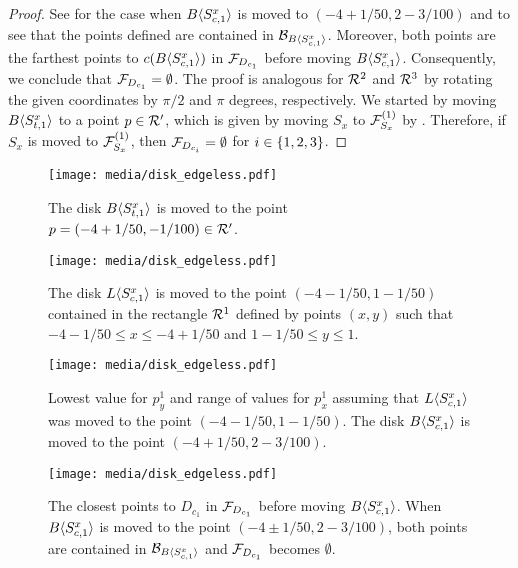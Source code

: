 \begin{toappendix}
\begin{toappendix}
\begin{proof}
    See  for the case when $B\langle S^x_{c,1}\rangle$ is moved to $(-4+ 1/50, 2-3/100)$ and  to see that the points defined are contained in $\mathcal{B}_{B\langle S^x_{c,1}\rangle}$.
    Moreover, both points are the farthest points to $c(B\langle S^x_{c,1}\rangle)$ in $\mathcal{F}_{D_{c_1}}$ before moving $B\langle S^x_{c,1}\rangle$. 
    Consequently, we conclude that $\mathcal{F}_{D_{c_1}} = \emptyset$.
    The proof is analogous for $\mathcal{R}^2$ and $\mathcal{R}^3$ by rotating the given coordinates by $\pi/2$ and $\pi$ degrees, respectively.
    We started by moving $B\langle S_{t,1}^x\rangle$ to a point $p \in \mathcal{R}'$, which is given by moving $S_x$ to $\mathcal{F}_{S_x}^{(1)}$ by .
    Therefore, if $S_x$ is moved to $\mathcal{F}_{S_x}^{(1)}$, then $\mathcal{F}_{D_{c_i}} = \emptyset$ for $i \in \{1,2,3\}$.
\end{proof}

\begin{figure}[!htb]
    \centering
    \texttt{[image: media/disk\_edgeless.pdf]}
    \caption{The disk $B\langle S_{t,1}^x\rangle$ is moved to the point $p= (-4+1/50,-1/100) \in \mathcal{R}'$.}
    \label{fig:feasible_areas_blocked_1}
\end{figure}
\begin{figure}[!htb]
    \centering
    \texttt{[image: media/disk\_edgeless.pdf]}
    \caption{The disk $L\langle S_{c,1}^x\rangle$ is moved to the point $(-4-1/50,1-1/50)$ contained in the rectangle $\mathcal{R}^1$ defined by points $(x,y)$ such that $-4-1/50 \le x \le -4+1/50$ and $1-1/50 \le y \le 1$.}
    \label{fig:feasible_areas_blocked_2}
\end{figure}
\begin{figure}[!htb]
    \centering
    \texttt{[image: media/disk\_edgeless.pdf]}
    \caption{Lowest value for $p_y^1$ and range of values for $p_x^1$ assuming that $L\langle S_{c,1}^x\rangle$ was moved to the point $(-4-1/50,1-1/50)$. The disk $B\langle S^x_{c,1}\rangle$ is moved to the point $(-4+1/50,2-3/100)$.}
    \label{fig:feasible_areas_blocked_3}
\end{figure}
\begin{figure}[!htb]
    \centering
    \texttt{[image: media/disk\_edgeless.pdf]}
    \caption{The closest points to $D_{c_1}$ in $\mathcal{F}_{D_{c_1}}$ before moving $B\langle S_{c,1}^x\rangle$. When $B\langle S_{c,1}^x\rangle$ is moved to the point $(-4\pm 1/50, 2-3/100)$, both points are contained in $\mathcal{B}_{B\langle S_{c,1}^x\rangle}$ and $\mathcal{F}_{D_{c_1}}$ becomes $\emptyset$.}
    \label{fig:feasible_areas_blocked_4}
\end{figure}    




\end{toappendix}
\end{toappendix}
